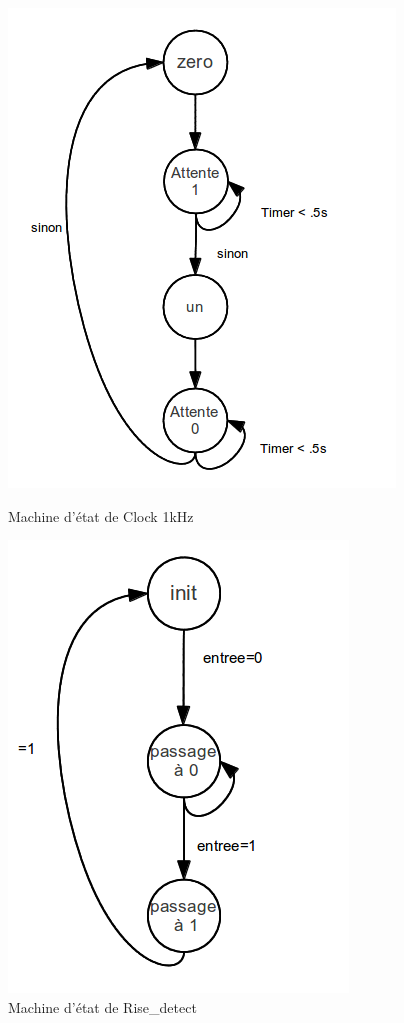 \documentclass[a4paper,11pt]{article}
\begin{document}
\begin{figure}[H]
   \begin{minipage}[b]{0.40\linewidth}
      \centering \includegraphics[scale=.6]{machine_1Hz.png}
      \caption{Machine d'état de Clock 1kHz}
   \end{minipage}\hfill
   \begin{minipage}[b]{0.40\linewidth}   
      \centering \includegraphics[scale=.6]{machine_front.png}
      \caption{Machine d'état de Rise\_detect}
   \end{minipage}
 \end{figure}
\end{document}

